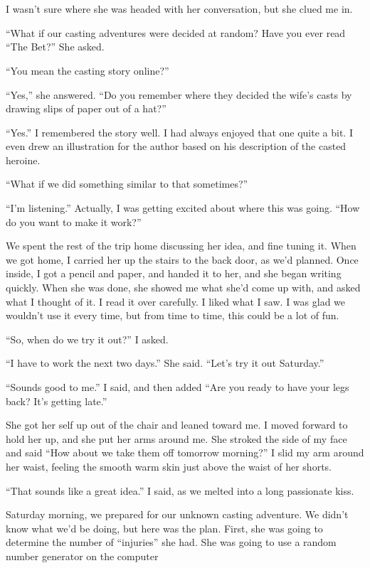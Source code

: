\chapter{~}
I wasn't sure where she was headed with her conversation, but she clued me in.

``What if our casting adventures were decided at random? Have you ever read ``The Bet?'' She
asked.

``You mean the casting story online?''

``Yes,'' she answered. ``Do you remember where they decided the wife's casts by drawing slips
of paper out of a hat?''

``Yes.'' I remembered the story well. I had always enjoyed that one quite a bit. I even drew
an illustration for the author based on his description of the casted heroine.

``What if we did something similar to that sometimes?''

``I'm listening.'' Actually, I was getting excited about where this was going. ``How do you
want to make it work?''

We spent the rest of the trip home discussing her idea, and fine tuning it. When we got
home, I carried her up the stairs to the back door, as we'd planned. Once inside, I got a pencil
and paper, and handed it to her, and she began writing quickly. When she was done, she showed me
what she'd come up with, and asked what I thought of it. I read it over carefully. I liked what
I saw. I was glad we wouldn't use it every time, but from time to time, this could be a lot of
fun.

``So, when do we try it out?'' I asked.

``I have to work the next two days.'' She said. ``Let's try it out Saturday.''

``Sounds good to me.'' I said, and then added ``Are you ready to have your legs back? It's
getting late.''

She got her self up out of the chair and leaned toward me. I moved forward to hold her up,
and she put her arms around me. She stroked the side of my face and said ``How about we take
them
off tomorrow morning?'' I slid my arm around her waist, feeling the smooth warm skin just above
the waist of her shorts.

``That sounds like a great idea.'' I said, as we melted into a long passionate kiss.

Saturday morning, we prepared for our unknown casting adventure. We didn't know what we'd
be doing, but here was the plan. First, she was going to determine the number of ``injuries''
she
had. She was going to use a random number generator on the computer

